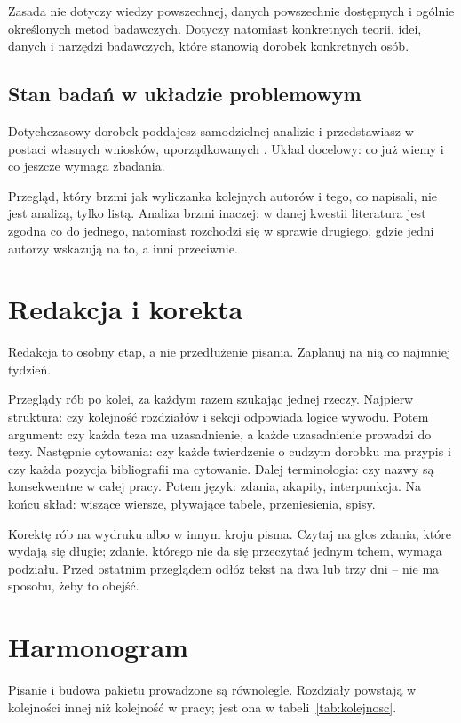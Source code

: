 Zasada nie dotyczy wiedzy powszechnej, danych powszechnie dostępnych i ogólnie określonych metod badawczych. Dotyczy natomiast konkretnych teorii, idei, danych i narzędzi badawczych, które stanowią dorobek konkretnych osób.

\subsection{Stan badań w układzie problemowym}

Dotychczasowy dorobek poddajesz samodzielnej analizie i przedstawiasz w postaci własnych wniosków, uporządkowanych . Układ docelowy: co już wiemy i co jeszcze wymaga zbadania.

Przegląd, który brzmi jak wyliczanka kolejnych autorów i tego, co napisali, nie jest analizą, tylko listą. Analiza brzmi inaczej: w danej kwestii literatura jest zgodna co do jednego, natomiast rozchodzi się w sprawie drugiego, gdzie jedni autorzy wskazują na to, a inni przeciwnie.

\section{Redakcja i korekta}

Redakcja to osobny etap, a nie przedłużenie pisania. Zaplanuj na nią co najmniej tydzień.

Przeglądy rób po kolei, za każdym razem szukając jednej rzeczy. Najpierw struktura: czy kolejność rozdziałów i sekcji odpowiada logice wywodu. Potem argument: czy każda teza ma uzasadnienie, a każde uzasadnienie prowadzi do tezy. Następnie cytowania: czy każde twierdzenie o cudzym dorobku ma przypis i czy każda pozycja bibliografii ma cytowanie. Dalej terminologia: czy nazwy są konsekwentne w całej pracy. Potem język: zdania, akapity, interpunkcja. Na końcu skład: wiszące wiersze, pływające tabele, przeniesienia, spisy.

Korektę rób na wydruku albo w innym kroju pisma. Czytaj na głos zdania, które wydają się długie; zdanie, którego nie da się przeczytać jednym tchem, wymaga podziału. Przed ostatnim przeglądem odłóż tekst na dwa lub trzy dni -- nie ma sposobu, żeby to obejść.

\section{Harmonogram}

Pisanie i budowa pakietu prowadzone są równolegle. Rozdziały powstają w kolejności innej niż kolejność w pracy; jest ona w tabeli~\ref{tab:kolejnosc}.

